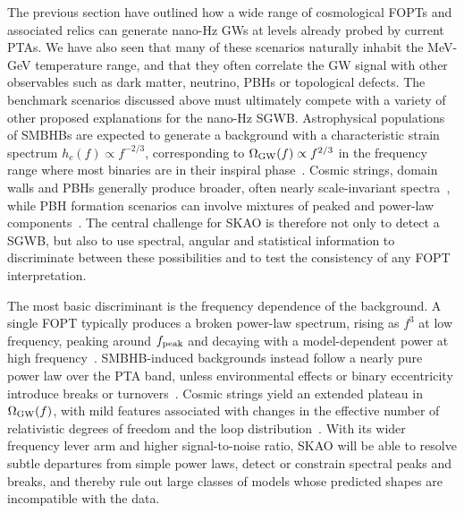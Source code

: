 \documentclass[a4paper,11pt]{article}
\begin{document}
The previous section have outlined how a wide range of cosmological FOPTs and associated relics can generate 
nano-Hz GWs at levels already probed by current PTAs. We have also seen that many of these scenarios naturally 
inhabit the MeV-GeV temperature range, and that they often correlate the GW signal with other observables 
such as dark matter, neutrino, PBHs or topological defects. The benchmark scenarios discussed above must ultimately 
compete with a variety of other proposed explanations for the nano-Hz SGWB. Astrophysical populations of SMBHBs 
are expected to generate a background with a characteristic strain spectrum $h_c(f)\propto f^{-2/3}$, corresponding 
to $\Omega_{\rm GW}(f)\propto f^{2/3}$ in the frequency range where most binaries are in their inspiral phase~\citep{Sesana:2013SMBHB}. Cosmic strings, domain walls and PBHs generally produce broader, often nearly 
scale-invariant spectra~\citep{BlancoPillado:2018ael,Servant:2023UHF,Borah:2023CSreview,
Sousa:2024CSGW}, while PBH formation scenarios can involve mixtures of peaked and power-law components~\citep{Carr:2020PBHReview,Sasaki:2016jop,Liu:2021svg,Gouttenoire:2023rxy}. The central challenge 
for SKAO is therefore not only to detect a SGWB, but also to use spectral, angular and statistical information 
to discriminate between these possibilities and to test the consistency of any FOPT interpretation.

The most basic discriminant is the frequency dependence of the background. A single FOPT typically produces 
a broken power-law spectrum, rising as $f^3$ at low frequency, peaking around $f_{\rm peak}$ and decaying with 
a model-dependent power at high frequency~\citep{Caprini:2015zlo,Caprini:2019egz,Hindmarsh:2020hop,Athron:2023uxb}. 
SMBHB-induced backgrounds instead follow a nearly pure power law over the PTA band, unless environmental effects 
or binary eccentricity introduce breaks or turnovers~\citep{Sesana:2013SMBHB}. Cosmic strings yield an extended 
plateau in $\Omega_{\rm GW}(f)$, with mild features associated with changes in the effective number of relativistic 
degrees of freedom and the loop distribution~\citep{BlancoPillado:2018ael,Ellis:2020ena,
Blasi:2020mfx,Ellis:2023tsl}. With its wider frequency lever arm and higher signal-to-noise ratio, 
SKAO will be able to resolve subtle departures from simple power laws, detect or constrain spectral peaks 
and breaks, and thereby rule out large classes of models whose predicted shapes are incompatible with the data.
\end{document}
